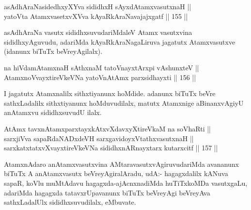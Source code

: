 \begin{shl}
\footnotemark[1]asAdhAraNasidedhxyXYva sididhxH sAyxdAtamxvasutxnaH || \\
yatoV\s ta AtamxvasetxvXVva kAyaRkAraNavajajxgatf \hfill || 155 ||  
\end{shl}

\begin{artha}
asAdhAraNa vasutx sididhxsuvudariMdaleV Atamx vasutxvina
sididhxyAguvudu, adariMda kAyaRkAraNagaLiruva jagatutx Atamxvasutxve
(idanunx biTuTx beVreyAgilalx).
\end{artha}

\begin{shl}
\footnotemark[2]na hiVdamAtamxnaH sAthxnaM tatoV\s nayxtArxpi vA\s shunxteV || \\
AtamxnoV\s vayxtireVkeVNa yatoV\s nAtAmx parxsidhayxti \hfill || 156 ||  
\end{shl}

\begin{artha}
I jagatutx Atamxnalilx sithxtiyanunx hoMdide. adanunx biTuTx beVre
sathxLadalilx sithxtiyanunx hoMduvudilalx, matutx Atamxnige
aBinanxvAgiyU anAtamxvu sididhxsuvudU ilalx.
\end{artha}


\begin{shl}
AtAmx tavxnAtamxparxtayxkAtxvXdavxyXtireVkaM na soV\s haRti || \\
sarxjiVva sapaRdaNADxdeVH sarxgavidoyxVtathxvasutxnaH || \\
sarxkatxtatxvXvayxtireVkeVNa sididhxnARnayxtarx kutarxcitf \hfill || 157 ||  
\end{shl}

\begin{artha}
AtamxnAdaro anAtamxvasutxvina AMtaravasutxvAgiruvudariMda avananunx
biTuTx A anAtamxvasutx beVreyAgiralAradu,  udA:- hagagxdalilx kANuva
sapaR, koVlu muMtAdavu hagagxda-ajAcnxnadiMda huTiTxkoMDa vasutxgaLu,
adariMda hagagxda tatavxrUpavanunx biTuTx beVreyAgi beVreyAva
sathxLadalUlx sididhxsuvudilalx, eMbuvate.
\end{artha}

